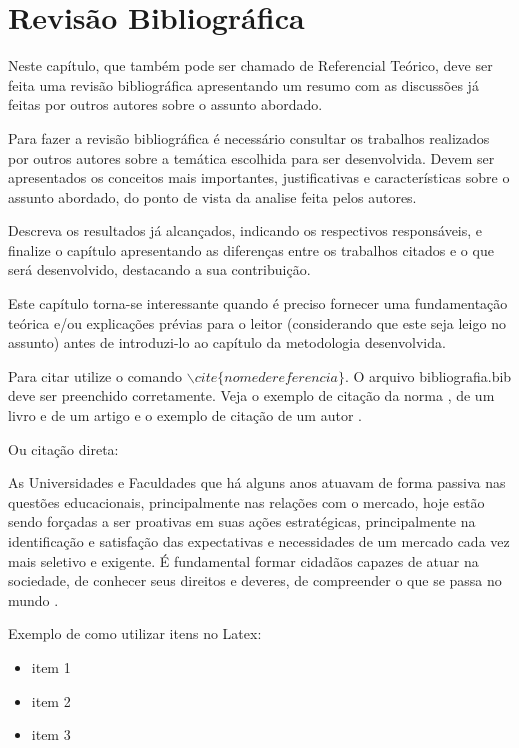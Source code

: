 \chapter{Revisão Bibliográfica} \label{RevisaoBibliografica}

Neste capítulo, que também pode ser chamado de Referencial Teórico, deve ser feita uma revisão bibliográfica apresentando um resumo com as discussões já feitas por outros autores sobre o assunto abordado.

Para fazer a revisão bibliográfica é necessário consultar os trabalhos  realizados por outros autores sobre a temática escolhida para ser desenvolvida. Devem ser apresentados os conceitos mais importantes, justificativas e características sobre o assunto abordado, do ponto de vista da analise feita pelos autores. 

Descreva os resultados já alcançados, indicando os respectivos responsáveis, e finalize o capítulo apresentando as diferenças entre os trabalhos citados e o que será desenvolvido, destacando a sua contribuição.

Este capítulo torna-se interessante quando é preciso fornecer uma fundamentação teórica e/ou explicações prévias para o leitor (considerando que este seja leigo no assunto) antes de introduzi-lo ao capítulo da metodologia desenvolvida.

Para citar utilize o comando $\backslash cite\{nomedereferencia\} $. O arquivo bibliografia.bib deve ser preenchido corretamente. Veja o exemplo de citação da norma \cite{NBR10520}, de um livro \cite{ogata} e de um artigo \cite{sbse} e o exemplo de citação de um autor .

Ou citação direta:

\begin{flushright}
\noindent
\parbox{\linewidth-4cm}{
As Universidades e Faculdades que há alguns anos atuavam de forma passiva nas questões educacionais, principalmente nas relações com o mercado, hoje estão sendo forçadas a ser proativas em suas ações estratégicas, principalmente na identificação e satisfação das expectativas e necessidades de um mercado cada vez mais seletivo e exigente. É fundamental formar cidadãos capazes de atuar na sociedade, de conhecer seus direitos e deveres, de compreender o que se passa no mundo  \cite{neves2002}.
}
\end{flushright}


Exemplo de como utilizar itens no Latex:

\begin{itemize}\itemsep5pt
    \item item 1
    \item item 2
    \item item 3
\end{itemize}








